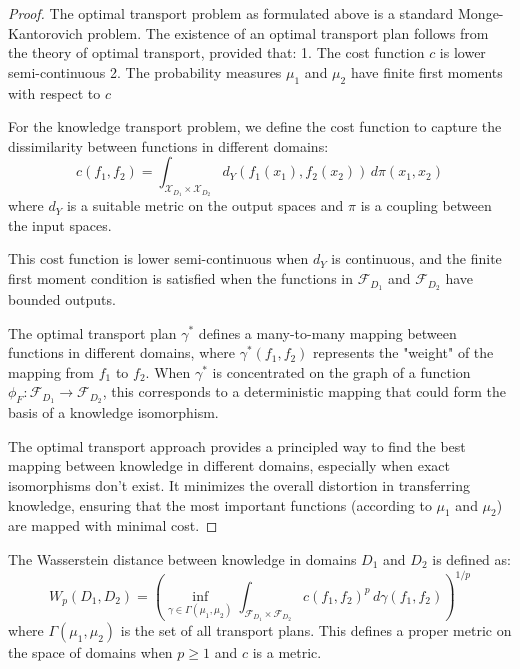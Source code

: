\begin{proof}
The optimal transport problem as formulated above is a standard Monge-Kantorovich problem. The existence of an optimal transport plan follows from the theory of optimal transport, provided that:
1. The cost function $c$ is lower semi-continuous
2. The probability measures $\mu_1$ and $\mu_2$ have finite first moments with respect to $c$

For the knowledge transport problem, we define the cost function to capture the dissimilarity between functions in different domains:
\begin{equation}
c(f_1, f_2) = \int_{\mathcal{X}_{D_1} \times \mathcal{X}_{D_2}} d_Y(f_1(x_1), f_2(x_2)) \, d\pi(x_1, x_2)
\end{equation}
where $d_Y$ is a suitable metric on the output spaces and $\pi$ is a coupling between the input spaces.

This cost function is lower semi-continuous when $d_Y$ is continuous, and the finite first moment condition is satisfied when the functions in $\mathcal{F}_{D_1}$ and $\mathcal{F}_{D_2}$ have bounded outputs.

The optimal transport plan $\gamma^*$ defines a many-to-many mapping between functions in different domains, where $\gamma^*(f_1, f_2)$ represents the "weight" of the mapping from $f_1$ to $f_2$. When $\gamma^*$ is concentrated on the graph of a function $\phi_F: \mathcal{F}_{D_1} \to \mathcal{F}_{D_2}$, this corresponds to a deterministic mapping that could form the basis of a knowledge isomorphism.

The optimal transport approach provides a principled way to find the best mapping between knowledge in different domains, especially when exact isomorphisms don't exist. It minimizes the overall distortion in transferring knowledge, ensuring that the most important functions (according to $\mu_1$ and $\mu_2$) are mapped with minimal cost.
\end{proof}

\begin{theorem}
The Wasserstein distance between knowledge in domains $D_1$ and $D_2$ is defined as:
\begin{equation}
W_p(D_1, D_2) = \left(\inf_{\gamma \in \Gamma(\mu_1, \mu_2)} \int_{\mathcal{F}_{D_1} \times \mathcal{F}_{D_2}} c(f_1, f_2)^p \, d\gamma(f_1, f_2)\right)^{1/p}
\end{equation}
where $\Gamma(\mu_1, \mu_2)$ is the set of all transport plans. This defines a proper metric on the space of domains when $p \geq 1$ and $c$ is a metric.
\end{theorem}

